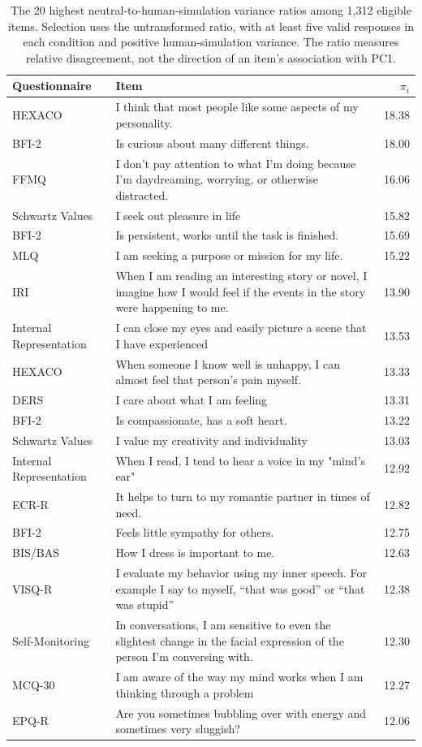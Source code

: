 \begin{table}[!t]
\centering\small
\begin{tabular}{@{}p{}p{}r@{}}
\toprule
Questionnaire & Item & $\pi_i$ \\
\midrule
HEXACO & I think that most people like some aspects of my personality. & 18.38 \\
BFI-2 & Is curious about many different things. & 18.00 \\
FFMQ & I don’t pay attention to what I’m doing because I’m daydreaming, worrying, or otherwise distracted. & 16.06 \\
Schwartz Values & I seek out pleasure in life & 15.82 \\
BFI-2 & Is persistent, works until the task is finished. & 15.69 \\
MLQ & I am seeking a purpose or mission for my life. & 15.22 \\
IRI & When I am reading an interesting story or novel, I imagine how I would feel if the events in the story were happening to me. & 13.90 \\
Internal Representation & I can close my eyes and easily picture a scene that I have experienced & 13.53 \\
HEXACO & When someone I know well is unhappy, I can almost feel that person's pain myself. & 13.33 \\
DERS & I care about what I am feeling & 13.31 \\
BFI-2 & Is compassionate, has a soft heart. & 13.22 \\
Schwartz Values & I value my creativity and individuality & 13.03 \\
Internal Representation & When I read, I tend to hear a voice in my "mind’s ear" & 12.92 \\
ECR-R & It helps to turn to my romantic partner in times of need. & 12.82 \\
BFI-2 & Feels little sympathy for others. & 12.75 \\
BIS/BAS & How I dress is important to me. & 12.63 \\
VISQ-R & I evaluate my behavior using my inner speech. For example I say to myself, “that was good” or “that was stupid” & 12.38 \\
Self-Monitoring & In conversations, I am sensitive to even the slightest change in the facial expression of the person I’m conversing with. & 12.30 \\
MCQ-30 & I am aware of the way my mind works when I am thinking through a problem & 12.27 \\
EPQ-R & Are you sometimes bubbling over with energy and sometimes very sluggish? & 12.06 \\
\bottomrule
\end{tabular}
\caption{The 20 highest neutral-to-human-simulation variance ratios among
1,312 eligible items. Selection uses the untransformed ratio, with at least
five valid responses in each condition and positive human-simulation variance.
The ratio measures relative disagreement, not the direction of an item's
association with PC1.}
\label{tab:ratio_item_examples}
\end{table}

